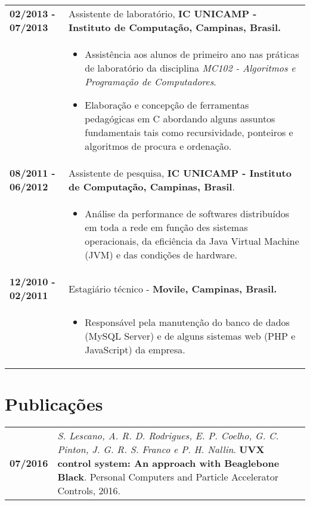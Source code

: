 \documentclass[10pt, a4paper]{article}
\begin{document}
\begin{tabular}{p{} p{}}
\textbf{02/2013 - 07/2013}   & Assistente de laboratório, \textbf{IC
UNICAMP - Instituto de Computação, Campinas, Brasil.} \\
& \vspace{-12pt}
\begin{itemize}
  \item Assistência aos alunos de primeiro ano nas práticas de laboratório da
  disciplina \textit{MC102 - Algoritmos e Programação de Computadores}.
  \vspace{-8pt}
  \item Elaboração e concepção de ferramentas pedagógicas em C
  abordando alguns assuntos fundamentais tais como recursividade, ponteiros e
  algoritmos de procura e ordenação.
\end{itemize}\\

\textbf{08/2011 - 06/2012} & Assistente de pesquisa, \textbf{IC UNICAMP -
Instituto de Computação, Campinas, Brasil}. \\
& \vspace{-12pt}
\begin{itemize}
  \item Análise da performance de softwares distribuídos em toda a rede em
  função des sistemas operacionais, da eficiência da Java Virtual Machine (JVM)
  e das condições de hardware.
\end{itemize}
\\


\textbf{12/2010 - 02/2011} & Estagiário técnico - \textbf{Movile,
Campinas, Brasil.}
\\  &  \vspace{-12pt}
\begin{itemize} 
\item Responsável pela manutenção do banco de dados (MySQL Server) e de
alguns sistemas web (PHP e JavaScript) da empresa.
\end{itemize}
\end{tabular}
\vspace{-12pt}


\section{Publicações}

\begin{tabular}{p{} p{}}

\textbf{07/2016}  & \textit{S. Lescano, A. R. D. Rodrigues, E. P.
Coelho, G. C. Pinton, J. G. R. S. Franco e P. H. Nallin}. \textbf{UVX
control system: An approach with Beaglebone Black}. Personal Computers and
Particle Accelerator Controls, 2016.
\\

\end{tabular}

% 
% 
% 

\end{document}
